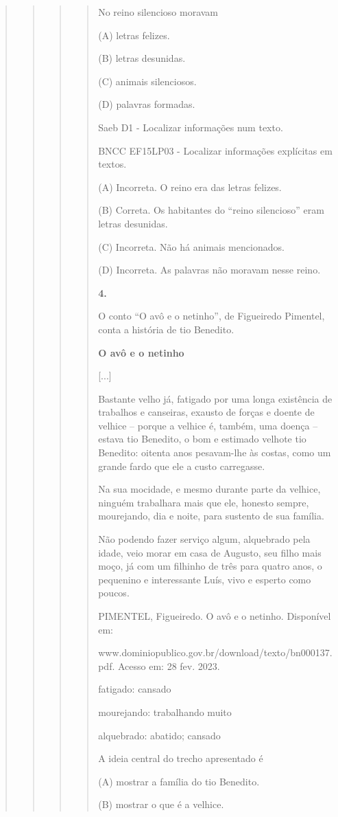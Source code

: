 \begin{quote}
\begin{quote}
\begin{quote}
\begin{quote}
No reino silencioso moravam

(A) letras felizes.

(B) letras desunidas.

(C) animais silenciosos.

(D) palavras formadas.

Saeb D1 - Localizar informações num texto.

BNCC EF15LP03 - Localizar informações explícitas em textos.

(A) Incorreta. O reino era das letras felizes.

(B) Correta. Os habitantes do ``reino silencioso'' eram letras
desunidas.

(C) Incorreta. Não há animais mencionados.

(D) Incorreta. As palavras não moravam nesse reino.

\textbf{4.}

O conto ``O avô e o netinho'', de Figueiredo Pimentel, conta a história
de tio Benedito.

\textbf{O avô e o netinho}

{[}...{]}

Bastante velho já, fatigado por uma longa existência de trabalhos e
canseiras, exausto de forças e doente de velhice -- porque a velhice é,
também, uma doença -- estava tio Benedito, o bom e estimado velhote tio
Benedito: oitenta anos pesavam-lhe às costas, como um grande fardo que
ele a custo carregasse.

Na sua mocidade, e mesmo durante parte da velhice, ninguém trabalhara
mais que ele, honesto sempre, mourejando, dia e noite, para sustento de
sua família.

Não podendo fazer serviço algum, alquebrado pela idade, veio morar em
casa de Augusto, seu filho mais moço, já com um filhinho de três para
quatro anos, o pequenino e interessante Luís, vivo e esperto como
poucos.

PIMENTEL, Figueiredo. O avô e o netinho. Disponível em:

www.dominiopublico.gov.br/download/texto/bn000137.pdf. Acesso em: 28
fev. 2023.

fatigado: cansado

mourejando: trabalhando muito

alquebrado: abatido; cansado

A ideia central do trecho apresentado é

(A) mostrar a família do tio Benedito.

(B) mostrar o que é a velhice.


\end{quote}
\end{quote}
\end{quote}
\end{quote}
